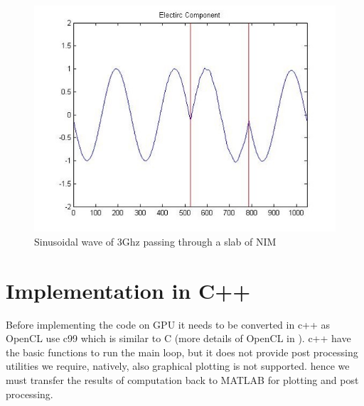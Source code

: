 \begin{figure}[H]
	\centering
		\includegraphics[width=5in]{Figures/drude2.jpg}
	\caption[Sinusoidal wave passing through DNG slab]{Sinusoidal wave of 3Ghz passing through a slab of NIM}
	\label{drude2}
\end{figure}

\section{Implementation in C++}

Before implementing the code on GPU it needs to be converted in c++ as OpenCL use c99 which is similar to C (more details of OpenCL in %
). c++ have the basic functions to run the main loop, but it does not provide post processing utilities we require, natively, also graphical plotting is not supported. hence we must transfer the results of computation back to MATLAB for plotting and post processing.

